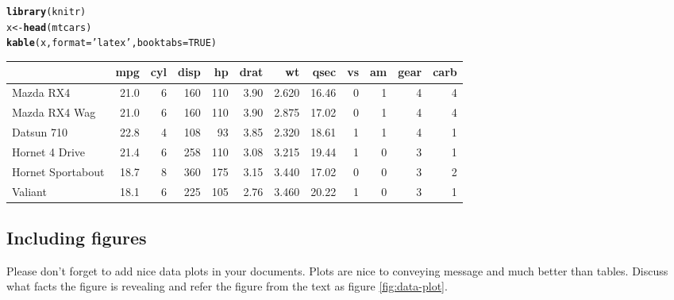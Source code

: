 \documentclass{article}\usepackage[]{graphicx}\usepackage[]{color}
\makeatletter
\newcommand{\hlnum}[1]{\textcolor[rgb]{0.686,0.059,0.569}{#1}}%
\newcommand{\hlstr}[1]{\textcolor[rgb]{0.192,0.494,0.8}{#1}}%
\newcommand{\hlstd}[1]{\textcolor[rgb]{0.345,0.345,0.345}{#1}}%
\newcommand{\hlkwb}[1]{\textcolor[rgb]{0.69,0.353,0.396}{#1}}%
\newcommand{\hlkwc}[1]{\textcolor[rgb]{0.333,0.667,0.333}{#1}}%
\newcommand{\hlkwd}[1]{\textcolor[rgb]{0.737,0.353,0.396}{\textbf{#1}}}%
\newenvironment{kframe}{%
 \def\at@end@of@kframe{}%
 \ifinner\ifhmode%
  \def\at@end@of@kframe{\end{minipage}}%
  \begin{minipage}{\columnwidth}%
 \fi\fi%
 \def\FrameCommand##1{\hskip\@totalleftmargin \hskip-\fboxsep
 \colorbox{shadecolor}{##1}\hskip-\fboxsep
     \hskip-\linewidth \hskip-\@totalleftmargin \hskip\columnwidth}%
 \MakeFramed {\advance\hsize-\width
   \@totalleftmargin\z@ \linewidth\hsize
   \@setminipage}}%
 {\par\unskip\endMakeFramed%
 \at@end@of@kframe}
\makeatother
\begin{document}
\begin{kframe}
\begin{alltt}
\hlkwd{library}\hlstd{(knitr)}
\hlstd{x} \hlkwb{<-} \hlkwd{head}\hlstd{(mtcars)}
\hlkwd{kable}\hlstd{(x,}\hlkwc{format} \hlstd{=} \hlstr{'latex'}\hlstd{,} \hlkwc{booktabs} \hlstd{=} \hlnum{TRUE}\hlstd{)}
\end{alltt}
\end{kframe}
\begin{tabular}{lrrrrrrrrrrr}
\toprule
  & mpg & cyl & disp & hp & drat & wt & qsec & vs & am & gear & carb\\
\midrule
Mazda RX4 & 21.0 & 6 & 160 & 110 & 3.90 & 2.620 & 16.46 & 0 & 1 & 4 & 4\\
Mazda RX4 Wag & 21.0 & 6 & 160 & 110 & 3.90 & 2.875 & 17.02 & 0 & 1 & 4 & 4\\
Datsun 710 & 22.8 & 4 & 108 & 93 & 3.85 & 2.320 & 18.61 & 1 & 1 & 4 & 1\\
Hornet 4 Drive & 21.4 & 6 & 258 & 110 & 3.08 & 3.215 & 19.44 & 1 & 0 & 3 & 1\\
Hornet Sportabout & 18.7 & 8 & 360 & 175 & 3.15 & 3.440 & 17.02 & 0 & 0 & 3 & 2\\
Valiant & 18.1 & 6 & 225 & 105 & 2.76 & 3.460 & 20.22 & 1 & 0 & 3 & 1\\
\bottomrule
\end{tabular}



\subsection{Including figures} Please don't forget to add nice data plots in your documents. Plots are nice to conveying message and much better than tables. Discuss what facts the figure is revealing and refer the figure from the text as figure \ref{fig:data-plot}.
\end{document}
